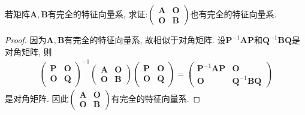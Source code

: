 \documentclass[../../main.tex]{subfiles}
\begin{document}
\begin{proposition}\label{example-6.38}
若矩阵\(\boldsymbol{A},\boldsymbol{B}\)有完全的特征向量系, 求证:\(\begin{pmatrix}
\boldsymbol{A}&\boldsymbol{O}\\
\boldsymbol{O}&\boldsymbol{B}
\end{pmatrix}\)也有完全的特征向量系.
\end{proposition}
\begin{proof}
因为\(\boldsymbol{A},\boldsymbol{B}\)有完全的特征向量系, 故相似于对角矩阵. 设\(\boldsymbol{P}^{-1}\boldsymbol{AP}\)和\(\boldsymbol{Q}^{-1}\boldsymbol{BQ}\)是对角矩阵, 则
\begin{align*}
\begin{pmatrix}
\boldsymbol{P}&\boldsymbol{O}\\
\boldsymbol{O}&\boldsymbol{Q}
\end{pmatrix}^{-1}
\begin{pmatrix}
\boldsymbol{A}&\boldsymbol{O}\\
\boldsymbol{O}&\boldsymbol{B}
\end{pmatrix}
\begin{pmatrix}
\boldsymbol{P}&\boldsymbol{O}\\
\boldsymbol{O}&\boldsymbol{Q}
\end{pmatrix}
=
\begin{pmatrix}
\boldsymbol{P}^{-1}\boldsymbol{AP}&\boldsymbol{O}\\
\boldsymbol{O}&\boldsymbol{Q}^{-1}\boldsymbol{BQ}
\end{pmatrix}
\end{align*}
是对角矩阵. 因此\(\begin{pmatrix}
\boldsymbol{A}&\boldsymbol{O}\\
\boldsymbol{O}&\boldsymbol{B}
\end{pmatrix}\)有完全的特征向量系. 
\end{proof}
\end{document}

